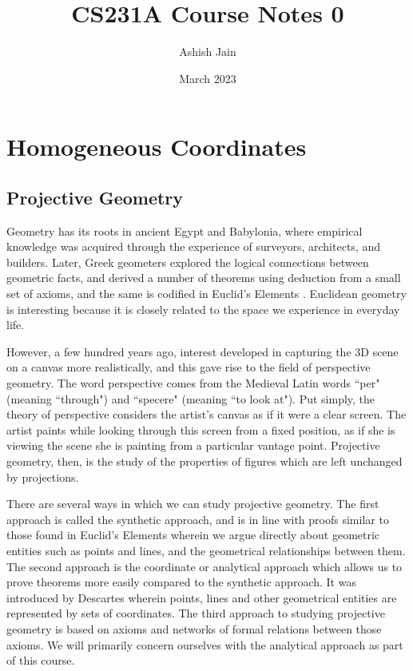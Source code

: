 \documentclass{article}
\title{CS231A Course Notes 0}
\author{Ashish Jain}
\date{March 2023}
\begin{document}
\maketitle

\section{Homogeneous Coordinates}
\subsection{Projective Geometry}
Geometry has its roots in ancient Egypt and Babylonia, where empirical knowledge was acquired through the experience of surveyors, architects, and builders. Later, Greek geometers explored the logical connections between geometric facts, and derived a number of theorems using deduction from a small set of axioms, and the same is codified in Euclid's Elements \cite{wiki:Euclid's_Elements}. Euclidean geometry is interesting because it is closely related to the space we experience in everyday life.

However, a few hundred years ago, interest developed in capturing the 3D scene on a canvas more realistically, and this gave rise to the field of perspective geometry. The word perspective comes from the Medieval Latin words ``per" (meaning ``through") and ``specere" (meaning ``to look at"). Put simply, the theory of perspective considers the artist's canvas as if it were a clear screen. The artist paints while looking through this screen from a fixed position, as if she is viewing the scene she is painting from a particular vantage point. Projective geometry, then, is the study of the properties of figures which are left unchanged by projections.

There are several ways in which we can study projective geometry. The first approach is called the synthetic approach, and is in line with proofs similar to those found in Euclid's Elements wherein we argue directly about geometric entities such as points and lines, and the geometrical relationships between them. The second approach is the coordinate or analytical approach which allows us to prove theorems more easily compared to the synthetic approach. It was introduced by Descartes wherein points, lines and other geometrical entities are represented by sets of coordinates. The third approach to studying projective geometry is based on axioms and networks of formal relations between those axioms. We will primarily concern ourselves with the analytical approach as part of this course.
\end{document}
